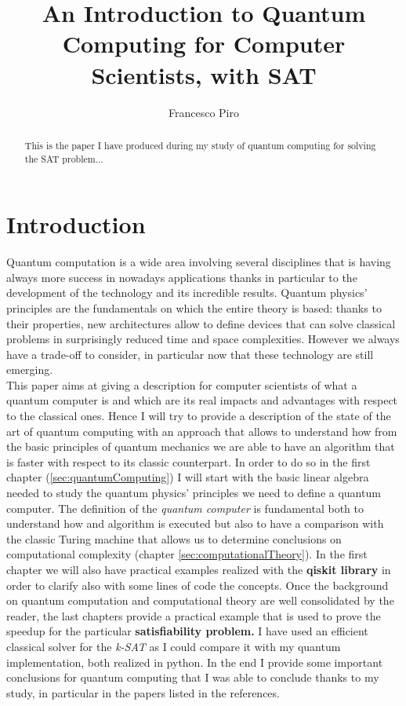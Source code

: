 \documentclass[english]{article}
\begin{document}
	\title{An Introduction to Quantum Computing for Computer Scientists, with SAT}
	\author{Francesco Piro}
	\maketitle
	
	\begin{abstract}
		This is the paper I have produced during my study of quantum computing for solving the SAT problem...
	\end{abstract}
	
	\section*{Introduction}
	\label{sec:introduction}
	Quantum computation is a wide area involving several disciplines that is having always more success in nowadays applications thanks in particular to the development of the technology and its incredible results. Quantum physics' principles are the fundamentals on which the entire theory is based: thanks to their properties, new architectures allow to define devices that can solve classical problems in surprisingly reduced time and space complexities. However we always have a trade-off to consider, in particular now that these technology are still emerging.\\
	
	This paper aims at giving a description for computer scientists of what a quantum computer is and which are its real impacts and advantages with respect to the classical ones. Hence I will try to provide a description of the state of the art of quantum computing with an approach that allows to understand how from the basic principles of quantum mechanics we are able to have an algorithm that is faster with respect to its classic counterpart. In order to do so in the first chapter (\ref{sec:quantumComputing}) I will start with the basic linear algebra needed to study the quantum physics' principles we need to define a quantum computer. The definition of the \emph{quantum computer} is fundamental both to understand how and algorithm is executed but also to have a comparison with the classic Turing machine that allows us to determine conclusions on computational complexity (chapter \ref{sec:computationalTheory}). In the first chapter we will also have practical examples realized with the \textbf{qiskit library} in order to clarify also with some lines of code the concepts. Once the background on quantum computation and computational theory are well consolidated by the reader, the last chapters provide a practical example that is used to prove the speedup for the particular \textbf{satisfiability problem.} I have used an efficient classical solver for the \emph{k-SAT} as I could compare it with my quantum implementation, both realized in python. In the end I provide some important conclusions for quantum computing that I was able to conclude thanks to my study, in particular in the papers listed in the references.
	
\end{document}
